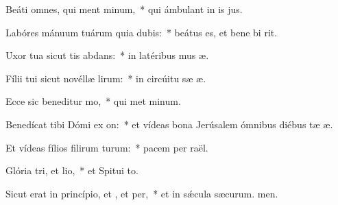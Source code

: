 \item Beáti omnes, qui ment minum,~* qui ámbulant in is jus.
\item Labóres mánuum tuárum quia dubis:~* beátus es, et bene bi rit.
\item Uxor tua sicut tis abdans:~* in latéribus mus æ.
\item Fílii tui sicut novéllæ lirum:~* in circúitu sæ æ.
\item Ecce sic beneditur mo,~* qui met minum.
\item Benedícat tibi Dómi ex on:~* et vídeas bona Jerúsalem ómnibus diébus tæ æ.
\item Et vídeas fílios filirum turum:~* pacem per raël.
\item Glória tri, et lio,~* et Spitui to.
\item Sicut erat in princípio, et , et per,~* et in sǽcula sæcurum. men.
